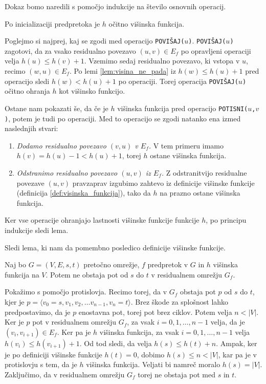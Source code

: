 \documentclass[mat1]{fmfdelo}
\begin{document}
\begin{dokaz}
Dokaz bomo naredili s pomočjo indukcije na število osnovnih operacij.

Po inicializaciji predpretoka je $h$ očitno višinska funkcija.

Poglejmo si najprej, kaj se zgodi med operacijo \texttt{POVIŠAJ($u$)}. \texttt{POVIŠAJ($u$)} zagotovi, da za vsako residualno povezavo $(u,v) \in E_f$ po opravljeni operaciji velja $h(u) \leq h(v) +1$. Vzemimo sedaj residualno povezavo, ki vstopa v $u$, recimo $(w,u) \in E_f$. Po lemi \ref{lem:visina_ne_pada} iz $h(w) \leq h(u) + 1$ pred operacijo sledi $h(w) < h(u) + 1$ po operaciji. Torej operacija \texttt{POVIŠAJ($u$)} očitno ohranja $h$ kot višinsko funkcijo.

Ostane nam pokazati še, da če je $h$ višinska funkcija pred operacijo \texttt{POTISNI($u$,$v$)}, potem je tudi po operaciji. Med to operacijo se zgodi natanko ena izmed naslednjih stvari:

\begin{enumerate}
\item \textit{Dodamo residualno povezavo $(v,u)$ v $E_f$.} V tem primeru imamo $h(v) = h(u) - 1 < h(u) + 1$, torej $h$ ostane višinska funkcija.
\item \textit{Odstranimo residualno povezavo $(u,v)$ iz $E_f$.} Z odstranitvijo residualne povezave $(u,v)$ pravzaprav izgubimo zahtevo iz definicije višinske funkcije (definicija \ref{def:visinska_funkcija}), tako da $h$ na prazno ostane višinska funkcija.
\end{enumerate}

Ker vse operacije ohranjajo lastnosti višinske funkcije funkcije $h$, po principu indukcije sledi lema.
\end{dokaz}

Sledi lema, ki nam da pomembno posledico definicije višinske funkcije.

\begin{lema}\label{lem:ni_poti}
Naj bo $G=(V,E,s,t)$ pretočno omrežje, $f$ predpretok v $G$ in $h$ višinska funkcija na $V$. Potem ne obstaja pot od $s$ do $t$ v residualnem omrežju $G_f$.
\end{lema}

\begin{dokaz}
Pokažimo s pomočjo protislovja. Recimo torej, da v $G_f$ obstaja pot $p$ od $s$ do $t$, kjer je $p = \langle v_0 = s, v_1, v_2, \dotsc v_{n-1}, v_n = t\rangle$. Brez škode za splošnost lahko predpostavimo, da je $p$ enostavna pot, torej pot brez ciklov. Potem velja $n < |V|$. Ker je $p$ pot v residualnem omrežju $G_f$, za vsak $i = 0, 1, \dotsc, n-1$ velja, da je $(v_i, v_{i+1}) \in E_f$. Ker pa je $h$ višinska funkcija, za vsak $i = 0, 1, \dotsc, n-1$ velja $h(v_i) \leq h(v_{i+1}) + 1$. Od tod sledi, da velja $h(s) \leq h(t) + n$. Ampak, ker je po definiciji višinske funkcije $h(t) = 0$, dobimo $h(s) \leq n < |V|$, kar pa je v protislovju s tem, da je $h$ višinska funkcija. Veljati bi namreč moralo $h(s) = |V|$. Zaključimo, da v residualnem omrežju $G_f$ torej ne obstaja pot med $s$ in $t$.
\end{dokaz}
\end{document}
